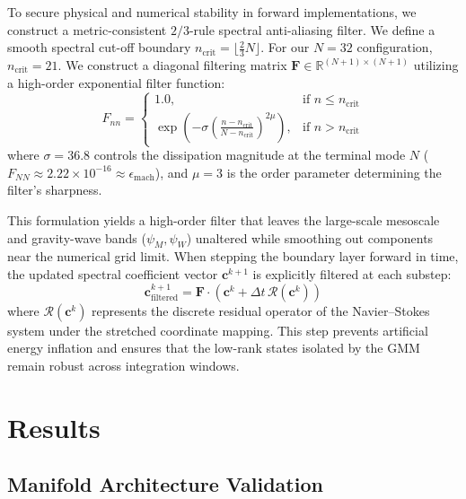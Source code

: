To secure physical and numerical stability in forward implementations, we construct a metric-consistent $2/3$-rule spectral anti-aliasing filter. We define a smooth spectral cut-off boundary $n_{\mathrm{crit}} = \lfloor \frac{2}{3} N \rfloor$. For our $N=32$ configuration, $n_{\mathrm{crit}} = 21$. We construct a diagonal filtering matrix $\mathbf{F} \in \mathbb{R}^{(N+1) \times (N+1)}$ utilizing a high-order exponential filter function:
\begin{equation}
F_{nn} = \begin{cases}
1.0, & \text{if } n \le n_{\mathrm{crit}} \\
\exp\left( -\sigma \left( \frac{n - n_{\mathrm{crit}}}{N - n_{\mathrm{crit}}} \right)^{\! 2\mu} \right), & \text{if } n > n_{\mathrm{crit}}
\end{cases}
\label{eq:exponential_filter}
\end{equation}
where $\sigma = 36.8$ controls the dissipation magnitude at the terminal mode $N$ ($F_{NN} \approx 2.22 \times 10^{-16} \approx \epsilon_{\mathrm{mach}}$), and $\mu = 3$ is the order parameter determining the filter's sharpness.

This formulation yields a high-order filter that leaves the large-scale mesoscale and gravity-wave bands ($\psi_M, \psi_W$) unaltered while smoothing out components near the numerical grid limit. When stepping the boundary layer forward in time, the updated spectral coefficient vector $\mathbf{c}^{k+1}$ is explicitly filtered at each substep:
\begin{equation}
\mathbf{c}^{k+1}_{\mathrm{filtered}} = \mathbf{F} \cdot \left( \mathbf{c}^k + \Delta t \, \mathbf{\mathcal{R}}(\mathbf{c}^k) \right)
\label{eq:filtered_time_step}
\end{equation}
where $\mathbf{\mathcal{R}}(\mathbf{c}^k)$ represents the discrete residual operator of the Navier--Stokes system under the stretched coordinate mapping. This step prevents artificial energy inflation and ensures that the low-rank states isolated by the GMM remain robust across integration windows.

\section{Results}
\label{sec:results}

\subsection{Manifold Architecture Validation}
\label{sec:results:manifold}

